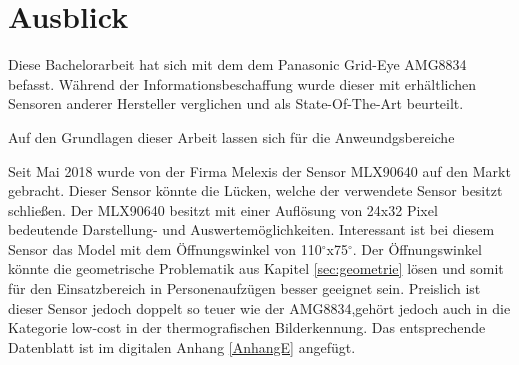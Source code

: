 \section{Ausblick}

Diese Bachelorarbeit hat sich mit dem dem Panasonic Grid-Eye AMG8834 befasst. Während der Informationsbeschaffung wurde dieser mit erhältlichen Sensoren anderer Hersteller verglichen und als State-Of-The-Art beurteilt.  

Auf den Grundlagen dieser Arbeit lassen sich für die Anweundgsbereiche 

Seit Mai 2018 wurde von der Firma Melexis der Sensor MLX90640 auf den Markt gebracht. Dieser Sensor könnte die Lücken, welche der verwendete Sensor besitzt schließen. Der MLX90640 besitzt mit einer Auflösung von 24x32 Pixel bedeutende Darstellung- und Auswertemöglichkeiten. Interessant ist bei diesem Sensor das Model mit dem Öffnungswinkel von 110$^\circ$x75$^\circ$. Der Öffnungswinkel könnte die geometrische Problematik aus Kapitel \ref{sec:geometrie} lösen und somit für den Einsatzbereich in Personenaufzügen besser geeignet sein. Preislich ist dieser Sensor jedoch doppelt so teuer wie der AMG8834,gehört jedoch auch in die Kategorie low-cost in der thermografischen Bilderkennung. Das entsprechende Datenblatt ist im digitalen Anhang \ref{AnhangE} angefügt. 




